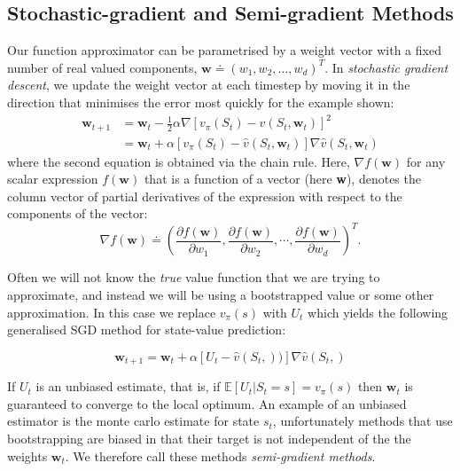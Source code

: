 \subsection{Stochastic-gradient and Semi-gradient Methods}
Our function approximator can be parametrised by a weight vector with a fixed number of real valued components, $\textbf{w} \doteq (w_1, w_2, \ldots, w_d)^T$. In \textit{stochastic gradient descent}, we update the weight vector at each timestep by moving it in the direction that minimises the error most quickly for the example shown:
\begin{align}
\textbf{w}_{t+1} &= \textbf{w}_t - \frac{1}{2}\alpha \nabla \left[v_\pi(S_t) - \hat{v}(S_t, \textbf{w}_t)\right]^2 \\
&= \textbf{w}_t + \alpha\left[v_\pi(S_t) - \hat{v}(S_t, \textbf{w}_t)\right] \nabla \hat{v}(S_t, \textbf{w}_t) 
\end{align}
where the second equation is obtained via the chain rule. Here, $\nabla f(\textbf{w})$ for any scalar expression $f(\textbf{w})$ that is a function of a vector (here \textbf{w}), denotes the column vector of partial derivatives of the expression with respect to the components of the vector:
\begin{equation}
	\nabla f(\textbf{w}) \doteq \left(\frac{\partial f(\textbf{w}) }{\partial w_1}, \frac{\partial f(\textbf{w}) }{\partial w_2}, \cdots, \frac{\partial f(\textbf{w}) }{\partial w_d}\right)^T.
\end{equation}

Often we will not know the \textit{true} value function that we are trying to approximate, and instead we will be using a bootstrapped value or some other approximation. In this case we replace $v_\pi(s)$ with $U_t$ which yields the following generalised SGD method for state-value prediction:

\begin{equation}
\textbf{w}_{t+1} =  \textbf{w}_t  + \alpha\left[U_t - \hat{v}(S_t, ))\right] \nabla \hat{v}(S_t, ) 
\end{equation}

If $U_t$ is an unbiased estimate, that is, if $\mathbb{E}[U_t | S_t =s] = v_\pi(s)$ then $\textbf{w}_t$ is guaranteed to converge to the local optimum. An example of an unbiased estimator is the monte carlo estimate for state $s_t$, unfortunately methods that use bootstrapping are biased in that their target is not independent of the the weights $ \textbf{w}_t $. We therefore call these methods \textit{semi-gradient methods}.

